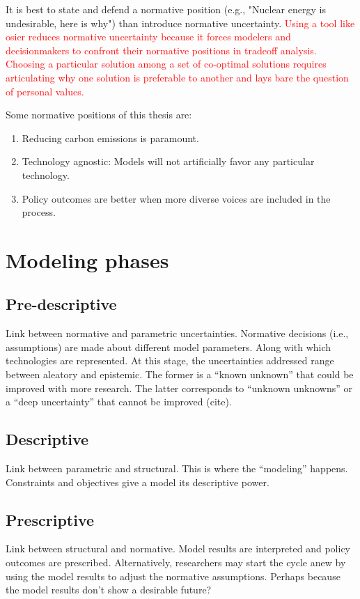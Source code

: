 It is best to state and defend a normative position (e.g., "Nuclear energy is
undesirable, here is why") than introduce normative uncertainty.
\textcolor{red}{Using a tool like \ac{osier} reduces normative uncertainty
because it forces modelers and decisionmakers to confront their normative
positions in tradeoff analysis. Choosing a particular solution among a set of
co-optimal solutions requires articulating why one solution is preferable to
another and lays bare the question of personal values.}

Some normative positions of this thesis are:
\begin{enumerate}
    \item Reducing carbon emissions is paramount.
    \item Technology agnostic: Models will not artificially favor any particular technology.
    \item Policy outcomes are better when more diverse voices are included in the process.
\end{enumerate}

\section{Modeling phases}

\subsection{Pre-descriptive}

Link between normative and parametric uncertainties. Normative decisions (i.e., assumptions)
are made about different model parameters. Along with which technologies are represented.
At this stage, the uncertainties addressed range between aleatory and epistemic. The former 
is a ``known unknown'' that could be improved with more research. The latter corresponds to 
``unknown unknowns'' or a ``deep uncertainty'' that cannot be improved (cite).

\subsection{Descriptive}
Link between parametric and structural. This is where the ``modeling'' happens. Constraints
and objectives give a model its descriptive power.

\subsection{Prescriptive}
Link between structural and normative. Model results are interpreted and policy outcomes
are prescribed. Alternatively, researchers may start the cycle anew by using the model
results to adjust the normative assumptions. Perhaps because the model results don't show
a desirable future?



